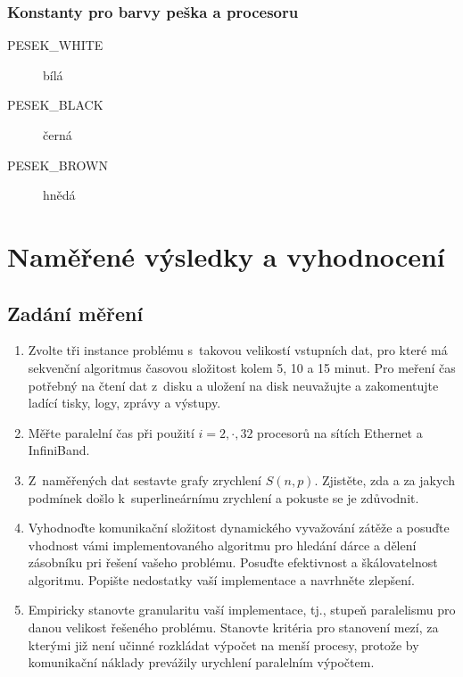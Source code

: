 \documentclass[12pt]{article}
\begin{document}
\subsubsection{Konstanty pro barvy peška a procesoru}
\begin{description}
\item[PESEK\_WHITE] bílá
\item[PESEK\_BLACK] černá
\item[PESEK\_BROWN] hnědá
\end{description}

\section{Naměřené výsledky a vyhodnocení}

\subsection{Zadání měření}
\begin{enumerate}
\item Zvolte tři instance problému s~takovou velikostí vstupních dat, pro které má
sekvenční algoritmus časovou složitost kolem 5, 10 a 15 minut. Pro
meření čas potřebný na čtení dat z~disku a uložení na disk
neuvažujte a zakomentujte ladící tisky, logy, zprávy a výstupy.
\item Měřte paralelní čas při použití $i=2,\cdot,32$ procesorů na sítích Ethernet a InfiniBand.
\item Z~naměřených dat sestavte grafy zrychlení $S(n,p)$. Zjistěte, zda a za jakych podmínek
došlo k~superlineárnímu zrychlení a pokuste se je zdůvodnit.
\item Vyhodnoďte komunikační složitost dynamického vyvažování zátěže a posuďte
vhodnost vámi implementovaného algoritmu pro hledání dárce a dělení
zásobníku pri řešení vašeho problému. Posuďte efektivnost a
škálovatelnost algoritmu. Popište nedostatky vaší implementace a
navrhněte zlepšení.
\item Empiricky stanovte
granularitu vaší implementace, tj., stupeň paralelismu pro danou
velikost řešeného problému. Stanovte kritéria pro stanovení mezí, za
kterými již není učinné rozkládat výpočet na menší procesy, protože
by komunikační náklady prevážily urychlení paralelním výpočtem.
\end{enumerate}
\end{document}
